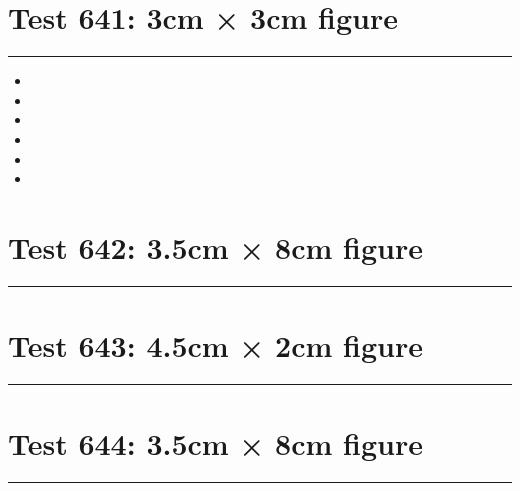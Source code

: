 \documentclass[a4paper,11pt]{article}
\begin{document}
\section*{Test 641: 3cm × 3cm figure}
\begin{swarmwrap}%
  \begin{minipage}[t]{3cm}
    \centering
    \rule{\linewidth}{3cm}
  \end{minipage}%
\end{swarmwrap}%
\swarmwrapnext
\lipsum[24]
\begin{itemize}
  \item \lipsum[25][1-3]
  \item \lipsum[26][1-3]
  \item \lipsum[27][1-3]
  \item \lipsum[28][1-3]
  \item \lipsum[29][1-3]
  \item \lipsum[30][1-3]
\end{itemize}
\section*{Test 642: 3.5cm × 8cm figure}
\begin{swarmwrap}%
  \begin{minipage}[t]{3cm}
    \centering
    \rule{\linewidth}{8cm}
  \end{minipage}%
\end{swarmwrap}%
\swarmwrapnext
\lipsum[16]
\lipsum[17]
\lipsum[18]
\lipsum[19]
\lipsum[20]
\lipsum[21]
\section*{Test 643: 4.5cm × 2cm figure}
\begin{swarmwrap}%
  \begin{minipage}[t]{4cm}
    \centering
    \rule{\linewidth}{2cm}
  \end{minipage}%
\end{swarmwrap}%
\swarmwrapnext
\lipsum[23]
\lipsum[24]
\lipsum[25]
\lipsum[26]
\section*{Test 644: 3.5cm × 8cm figure}
\begin{swarmwrap}%
  \begin{minipage}[t]{3cm}
    \centering
    \rule{\linewidth}{8cm}
  \end{minipage}%
\end{swarmwrap}%
\swarmwrapnext
\lipsum[146]
\lipsum[147]
\lipsum[148]
\lipsum[149]
\lipsum[150]
\end{document}
